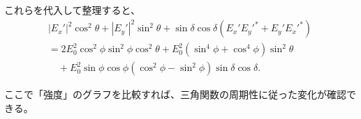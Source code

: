 \documentclass[a4paper,11pt]{jsarticle}
\numberwithin{equation}{section}
\begin{document}
これらを代入して整理すると、
\begin{align}
    |E_x'|^2 \cos^2 \theta + |E_y'|^2 \sin^2 \theta + \sin \delta \cos \delta (E_x' E_y'^* + E_y' E_x'^*) \\
    = 2 E_0^2 \cos^2 \phi \sin^2 \phi \cos^2 \theta + E_0^2 (\sin^4 \phi + \cos^4 \phi) \sin^2 \theta \\
    \quad + E_0^2 \sin \phi \cos \phi (\cos^2 \phi - \sin^2 \phi) \sin \delta \cos \delta.
\end{align}

ここで「強度」のグラフを比較すれば、三角関数の周期性に従った変化が確認できる。
\end{document}
